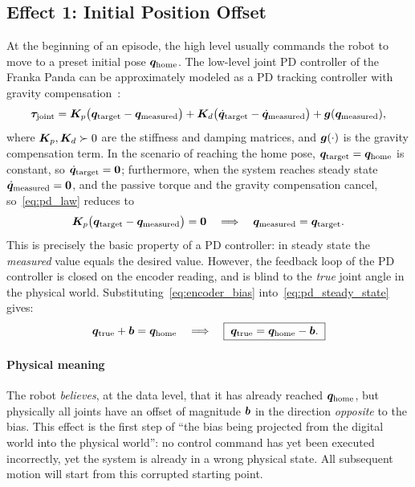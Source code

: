 \subsection{Effect 1: Initial Position Offset}\label{subsec:effect1}

At the beginning of an episode, the high level usually commands the robot to move to a preset initial pose $\bm{q}_{\text{home}}$. The low-level joint PD controller of the Franka Panda can be approximately modeled as a PD tracking controller with gravity compensation~\cite{siciliano2010robotics}:
\begin{equation}
  \bm{\tau}_{\text{joint}} = \bm{K}_p \big(\bm{q}_{\text{target}} - \bm{q}_{\text{measured}}\big)
  + \bm{K}_d \big(\dot{\bm{q}}_{\text{target}} - \dot{\bm{q}}_{\text{measured}}\big)
  + \bm{g}(\bm{q}_{\text{measured}}),
  \label{eq:pd_law}
\end{equation}
where $\bm{K}_p, \bm{K}_d \succ 0$ are the stiffness and damping matrices, and $\bm{g}(\cdot)$ is the gravity compensation term. In the scenario of reaching the home pose, $\bm{q}_{\text{target}} = \bm{q}_{\text{home}}$ is constant, so $\dot{\bm{q}}_{\text{target}} = \bm{0}$; furthermore, when the system reaches steady state $\dot{\bm{q}}_{\text{measured}} = \bm{0}$, and the passive torque and the gravity compensation cancel, so~\cref{eq:pd_law} reduces to
\begin{equation}
  \bm{K}_p \big(\bm{q}_{\text{target}} - \bm{q}_{\text{measured}}\big) = \bm{0}
  \quad\Longrightarrow\quad
  \bm{q}_{\text{measured}} = \bm{q}_{\text{target}}.
  \label{eq:pd_steady_state}
\end{equation}
This is precisely the basic property of a PD controller: in steady state the \emph{measured} value equals the desired value. However, the feedback loop of the PD controller is closed on the encoder reading, and is blind to the \emph{true} joint angle in the physical world. Substituting~\cref{eq:encoder_bias} into~\cref{eq:pd_steady_state} gives:
\begin{equation}
  \bm{q}_{\text{true}} + \bm{b} = \bm{q}_{\text{home}}
  \quad\Longrightarrow\quad
  \boxed{\;\bm{q}_{\text{true}} = \bm{q}_{\text{home}} - \bm{b}.\;}
  \label{eq:effect1}
\end{equation}

\paragraph{Physical meaning} The robot \emph{believes}, at the data level, that it has already reached $\bm{q}_{\text{home}}$, but physically all joints have an offset of magnitude $\bm{b}$ in the direction \emph{opposite} to the bias. This effect is the first step of ``the bias being projected from the digital world into the physical world'': no control command has yet been executed incorrectly, yet the system is already in a wrong physical state. All subsequent motion will start from this corrupted starting point.

